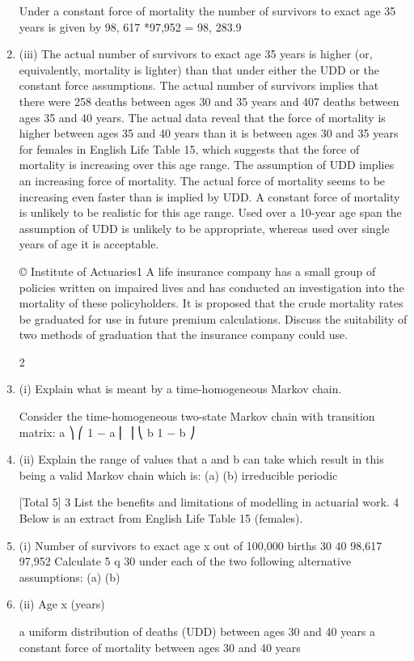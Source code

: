 \documentclass[a4paper,12pt]{article}
\begin{document}
\begin{enumerate}
Under a constant force of mortality the number of survivors to
exact age 35 years is given by
98, 617 *97,952 = 98, 283.9
\item (iii)
The actual number of survivors to exact age 35 years is higher (or,
equivalently, mortality is lighter) than that under either the UDD or the
constant force assumptions.
The actual number of survivors implies that there were 258 deaths between
ages 30 and 35 years and 407 deaths between ages 35 and 40 years.
The actual data reveal that the force of mortality is higher between ages 35 and
40 years than it is between ages 30 and 35 years for females in English Life
Table 15, which suggests that the force of mortality is increasing over this age
range.
The assumption of UDD implies an increasing force of mortality.
The actual force of mortality seems to be increasing even faster than is implied
by UDD.
A constant force of mortality is unlikely to be realistic for this age range.
Used over a 10-year age span the assumption of UDD is unlikely to be
appropriate, whereas used over single years of age it is acceptable.


\newpage

© Institute of Actuaries1
A life insurance company has a small group of policies written on impaired lives and
has conducted an investigation into the mortality of these policyholders. It is
proposed that the crude mortality rates be graduated for use in future premium
calculations.
Discuss the suitability of two methods of graduation that the insurance company could
use.

2
\item (i)
Explain what is meant by a time-homogeneous Markov chain.

Consider the time-homogeneous two-state Markov chain with transition matrix:
a ⎞
⎛ 1 − a
⎜
⎟
⎝ b 1 − b ⎠
\item (ii)
Explain the range of values that a and b can take which result in this being a
valid Markov chain which is:
(a)
(b)
irreducible
periodic

[Total 5]
3 List the benefits and limitations of modelling in actuarial work.
4 Below is an extract from English Life Table 15 (females).
\item (i)
Number of survivors to
exact age x out of
100,000 births
30
40 98,617
97,952
Calculate 5 q 30 under each of the two following alternative assumptions:
(a)
(b)
\item (ii)
Age x
(years)

a uniform distribution of deaths (UDD) between ages 30 and 40 years
a constant force of mortality between ages 30 and 40 years


\end{enumerate}
\end{document}
